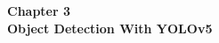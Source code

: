 \begin{center}

    \thispagestyle{empty}
    \vspace*{\fill}
    
    \Huge 
    \textbf{Chapter 3\\  Object Detection With YOLOv5 }
       

    \vspace*{\fill}
\end{center}